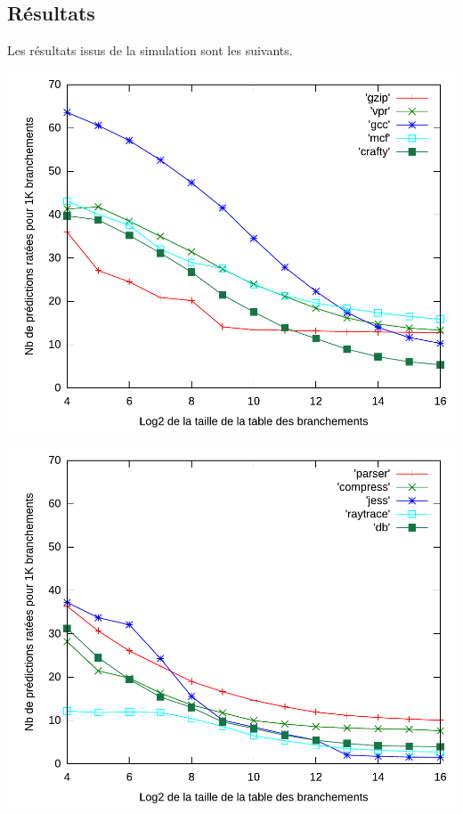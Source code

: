 \documentclass[a4paper]{article}
\begin{document}
\subsection{Résultats}
Les résultats issus de la simulation sont les suivants.
\par
\begin{minipage}{.48\linewidth}
\includegraphics[width=\linewidth]{../figures-gshare/gshare-0}
\end{minipage}%
\hfill
\begin{minipage}{.48\linewidth}
\includegraphics[width=\linewidth]{../figures-gshare/gshare-1}
\end{minipage}
\end{document}

